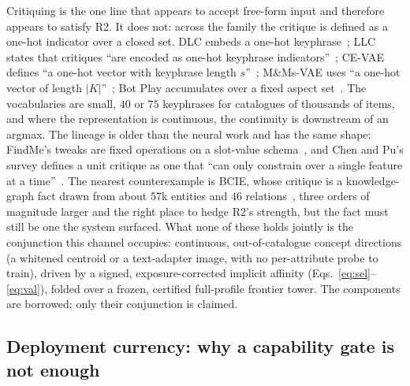 \documentclass[acmsmall,review,anonymous]{acmart}
\begin{document}
Critiquing is the one line that appears to accept free-form input and therefore appears to satisfy R2. It does not: across the family the critique is defined as a one-hot indicator over a closed set. DLC embeds a one-hot keyphrase~\citep{wu2019dlc}; LLC states that critiques ``are encoded as one-hot keyphrase indicators''~\citep{luo2020llc}; CE-VAE defines ``a one-hot vector with keyphrase length $s$''~\citep{luo2020cevae}; M\&Ms-VAE uses ``a one-hot vector of length $|K|$''~\citep{antognini2021mmvae}; Bot Play accumulates over a fixed aspect set~\citep{li2021botplay}. The vocabularies are small, $40$ or $75$ keyphrases for catalogues of thousands of items, and where the representation is continuous, the continuity is downstream of an argmax. The lineage is older than the neural work and has the same shape: FindMe's tweaks are fixed operations on a slot-value schema~\citep{burke1996findme}, and Chen and Pu's survey defines a unit critique as one that ``can only constrain over a single feature at a time''~\citep{chenpu2012critiquing}. The nearest counterexample is BCIE, whose critique is a knowledge-graph fact drawn from about $57$k entities and $46$ relations~\citep{toroghi2023bcie}, three orders of magnitude larger and the right place to hedge R2's strength, but the fact must still be one the system surfaced. What none of these holds jointly is the conjunction this channel occupies: continuous, out-of-catalogue concept directions (a whitened centroid or a text-adapter image, with no per-attribute probe to train), driven by a signed, exposure-corrected implicit affinity (Eqs.~\eqref{eq:sel}--\eqref{eq:val}), folded over a frozen, certified full-profile frontier tower. The components are borrowed; only their conjunction is claimed.

\subsection{Deployment currency: why a capability gate is not enough}\label{sec:concept:deploy}
\end{document}
